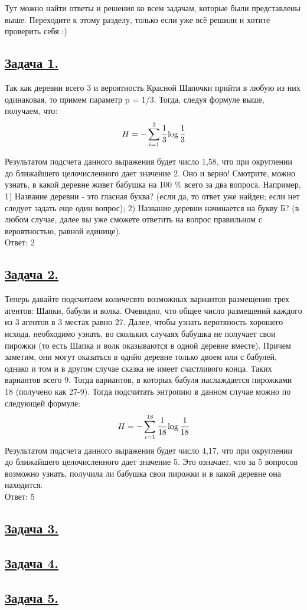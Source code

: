 Тут можно найти ответы и решения ко всем задачам, которые были представлены выше. Переходите к этому разделу, только если уже всё решили и хотите проверить себя :)

\subsection*{\hyperref[sec:problem1]{Задача 1.}}
\label{sec:sol_problem1}
Так как деревни всего 3 и вероятность Красной Шапочки прийти в любую из них одинаковая, то примем параметр p = 1/3. Тогда, следуя формуле выше, получаем, что:
\[H=-\sum\limits_{i=1}^3 \cfrac{1}{3}\log \cfrac{1}{3} \]

Результатом подсчета данного выражения будет число 1,58, что при округлении до ближайшего целочисленного дает значение 2. Оно и верно! Смотрите, можно узнать, в какой деревне живет бабушка на 100 \%  всего за два вопроса. 
Например, 1) Название деревни - это гласная буква? (если да, то ответ уже найден; если нет следует задать еще один вопрос); 2) Название деревни начинается на букву Б? (в любом случае, далее вы уже сможете ответить на вопрос правильном с вероятностью, равной единице). \\

Ответ: 2
\subsection*{\hyperref[sec:problem2]{Задача 2.}}
\label{sec:sol_problem2}
Теперь давайте подсчитаем количесвто возможных вариантов размещения трех агентов: Шапки, бабули и волка. Очевидно, что общее число размещений каждого из 3 агентов в 3 местах равно 27. 
Далее, чтобы узнать веротяность хорошего исхода, необходимо узнать, во скольких случаях бабушка не получает свои пирожки (то есть Шапка и волк оказываются в одной деревне вместе). Причем заметим, они могут оказаться в однйо деревне только двоем или с бабулей, однако и том и в другом случае сказка не имеет счастливого конца. Таких вариантов всего 9. Тогда вариантов, в которых бабуля наслаждается пирожками 18 (получено как 27-9).
Тогда подсчитать энтропию в данном случае можно по следующей формуле:
\[H=-\sum\limits_{i=1}^{18}  \cfrac{1}{18}\log \cfrac{1}{18} \]
Результатом подсчета данного выражения будет число 4,17, что при округлении до ближайшего целочисленного дает значение 5. Это означает, что за 5 вопросов возможно узнать, получила ли бабушка свои пирожки и в какой деревне она находится. \\ 

Ответ: 5

\subsection*{\hyperref[sec:problem3]{Задача 3.}}
\label{sec:sol_problem3}



\subsection*{\hyperref[sec:problem4]{Задача 4.}}
\label{sec:sol_problem4}

\subsection*{\hyperref[sec:problem5]{Задача 5.}}
\label{sec:sol_problem5}